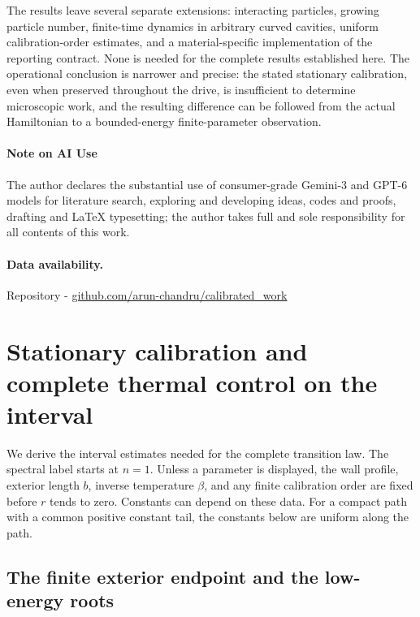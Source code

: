 \documentclass[aps,pra,reprint,superscriptaddress,longbibliography]{revtex4-2}
\begin{document}
The results leave several separate extensions: interacting particles, growing particle number, finite-time dynamics in arbitrary curved cavities, uniform calibration-order estimates, and a material-specific implementation of the reporting contract. None is needed for the complete results established here. The operational conclusion is narrower and precise: the stated stationary calibration, even when preserved throughout the drive, is insufficient to determine microscopic work, and the resulting difference can be followed from the actual Hamiltonian to a bounded-energy finite-parameter observation.


\paragraph*{Note on AI Use}
The author declares the substantial use of consumer-grade Gemini-3 and GPT-6 models for literature search, exploring and developing ideas, codes and proofs, drafting and LaTeX typesetting; the author takes full and sole responsibility for all contents of this work.

\paragraph*{Data availability.}
Repository - 
\href{https://github.com/arun-chandru/calibrated_work}{github.com/arun-chandru/calibrated\_work}

\newpage

\appendix
\section{Stationary calibration and complete thermal control on the interval}
\label{app:intervalcalibration}

We derive the interval estimates needed for the complete transition law. The
spectral label starts at $n=1$. Unless a parameter is displayed, the wall
profile, exterior length $b$, inverse temperature $\beta$, and any finite
calibration order are fixed before $r$ tends to zero. Constants can depend on
these data. For a compact path with a common positive constant tail, the
constants below are uniform along the path.

\subsection{The finite exterior endpoint and the low-energy roots}
\end{document}
